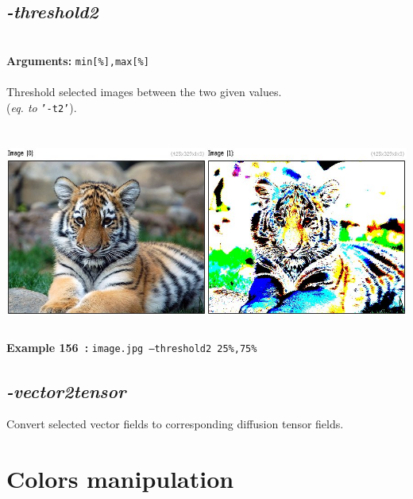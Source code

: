 \documentclass[a4paper,11pt,twoside]{book}
\begin{document}
\subsection{\emph{-threshold2} }\vspace*{-0.5em}
~\\\textbf{Arguments: } 
{\small \texttt{min[\%],max[\%]}}\\~\\
Threshold selected images between the two given values.
~\\(\emph{eq. to} {\small \texttt{'-t2'}}).
\begin{center}\includegraphics[keepaspectratio=true,height=7cm,width=\textwidth]{img/gmic_def156.jpg}\\
{\footnotesize \textbf{Example 156~:} \texttt{image.jpg --threshold2 25\%,75\%}}
\end{center}

\subsection{\emph{-vector2tensor} }\vspace*{-0.5em}
Convert selected vector fields to corresponding diffusion tensor fields.

\section{Colors manipulation}
\end{document}

